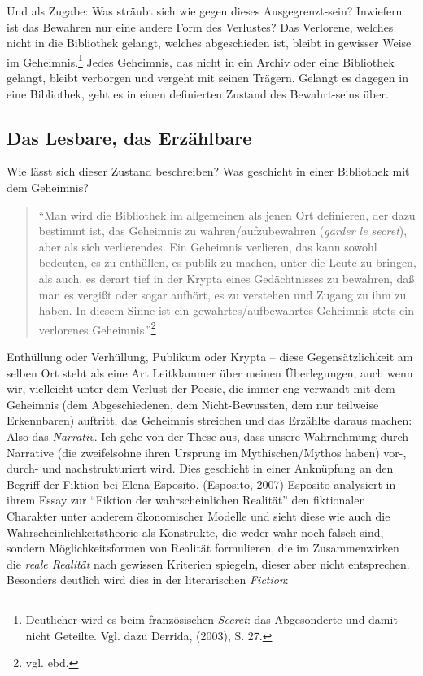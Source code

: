 \documentclass[output=paper]{langscibook}
\begin{document}
Und als Zugabe: Was sträubt sich wie gegen dieses Ausgegrenzt-sein?
Inwiefern ist das Bewahren nur eine andere Form des Verlustes? Das
Verlorene, welches nicht in die Bibliothek gelangt, welches abgeschieden
ist, bleibt in gewisser Weise im Geheimnis.\footnote{Deutlicher wird es
  beim französischen \emph{Secret}: das Abgesonderte und damit nicht
  Geteilte. Vgl. dazu Derrida, (2003), S. 27.} Jedes Geheimnis, das
nicht in ein Archiv oder eine Bibliothek gelangt, bleibt verborgen und
vergeht mit seinen Trägern. Gelangt es dagegen in eine Bibliothek, geht
es in einen definierten Zustand des Bewahrt-seins über.

\hypertarget{das-lesbare-das-erzuxe4hlbare}{%
\subsection*{Das Lesbare, das
Erzählbare}\label{das-lesbare-das-erzuxe4hlbare}}

Wie lässt sich dieser Zustand beschreiben? Was geschieht in einer
Bibliothek mit dem Geheimnis?

\begin{quote}
\enquote{Man wird die Bibliothek im allgemeinen als jenen Ort
definieren, der dazu bestimmt ist, das Geheimnis zu wahren/aufzubewahren
(\emph{garder le secret}), aber als sich verlierendes. Ein Geheimnis
verlieren, das kann sowohl bedeuten, es zu enthüllen, es publik zu
machen, unter die Leute zu bringen, als auch, es derart tief in der
Krypta eines Gedächtnisses zu bewahren, daß man es vergißt oder sogar
aufhört, es zu verstehen und Zugang zu ihm zu haben. In diesem Sinne ist
ein gewahrtes/aufbewahrtes Geheimnis stets ein verlorenes
Geheimnis.}\footnote{vgl. ebd.}
\end{quote}

\noindent Enthüllung oder Verhüllung, Publikum oder Krypta -- diese
Gegensätzlichkeit am selben Ort steht als eine Art Leitklammer über
meinen Überlegungen, auch wenn wir, vielleicht unter dem Verlust der
Poesie, die immer eng verwandt mit dem Geheimnis (dem Abgeschiedenen,
dem Nicht-Bewussten, dem nur teilweise Erkennbaren) auftritt, das
Geheimnis streichen und das Erzählte daraus machen: Also das
\emph{Narrativ}. Ich gehe von der These aus, dass unsere Wahrnehmung
durch Narrative (die zweifelsohne ihren Ursprung im Mythischen/Mythos
haben) vor-, durch- und nachstrukturiert wird. Dies geschieht in einer
Anknüpfung an den Begriff der Fiktion bei Elena Esposito. (Esposito,
2007) Esposito analysiert in ihrem Essay zur \enquote{Fiktion der
wahrscheinlichen Realität} den fiktionalen Charakter unter anderem
ökonomischer Modelle und sieht diese wie auch die
Wahrscheinlichkeitstheorie als Konstrukte, die weder wahr noch falsch
sind, sondern Möglichkeitsformen von Realität formulieren, die im
Zusammenwirken die \emph{reale Realität} nach gewissen Kriterien
spiegeln, dieser aber nicht entsprechen. Besonders deutlich wird dies in
der literarischen \emph{Fiction}:
\end{document}
